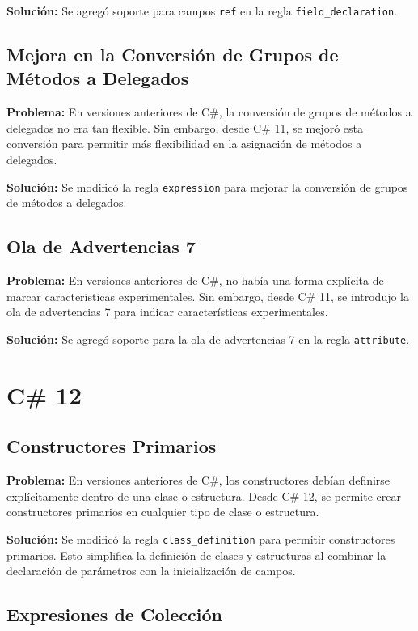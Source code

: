 \textbf{Solución:} Se agregó soporte para campos \texttt{ref} en la regla \texttt{field\_declaration}.

\subsection{Mejora en la Conversión de Grupos de Métodos a Delegados}

\textbf{Problema:} En versiones anteriores de C\#, la conversión de grupos de métodos a delegados no era tan flexible. Sin embargo, desde C\# 11, se mejoró esta conversión para permitir más flexibilidad en la asignación de métodos a delegados.

\textbf{Solución:} Se modificó la regla \texttt{expression} para mejorar la conversión de grupos de métodos a delegados.

\subsection{Ola de Advertencias 7}

\textbf{Problema:} En versiones anteriores de C\#, no había una forma explícita de marcar características experimentales. Sin embargo, desde C\# 11, se introdujo la ola de advertencias 7 para indicar características experimentales.

\textbf{Solución:} Se agregó soporte para la ola de advertencias 7 en la regla \texttt{attribute}.


\section{C\# 12}

\subsection{Constructores Primarios}

\textbf{Problema:} En versiones anteriores de C\#, los constructores deb\'ian definirse expl\'icitamente dentro de una clase o estructura. Desde C\# 12, se permite crear constructores primarios en cualquier tipo de clase o estructura.

\textbf{Soluci\'on:} Se modific\'o la regla \texttt{class\_definition} para permitir constructores primarios. Esto simplifica la definici\'on de clases y estructuras al combinar la declaraci\'on de par\'ametros con la inicializaci\'on de campos.

\subsection{Expresiones de Colecci\'on}

